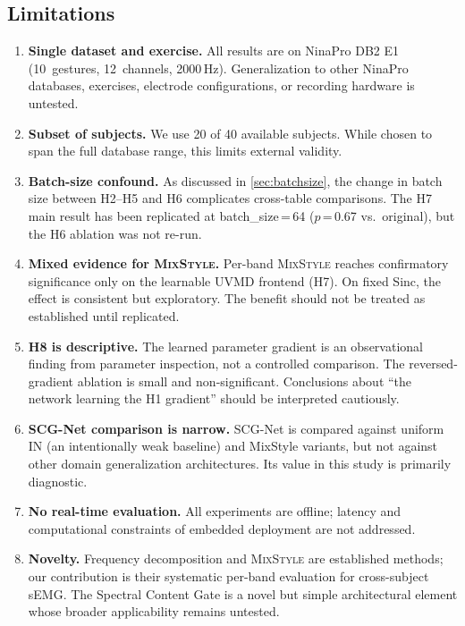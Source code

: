 \documentclass[conference]{IEEEtran}
\newcommand{\mixstyle}{\textsc{MixStyle}}
\newcommand{\uvmd}{\textsc{UVMD}}
\begin{document}
\subsection{Limitations}
\begin{enumerate}
    \item \textbf{Single dataset and exercise.} All results are on NinaPro DB2 E1 (10~gestures, 12~channels, 2000\,Hz). Generalization to other NinaPro databases, exercises, electrode configurations, or recording hardware is untested.
    \item \textbf{Subset of subjects.} We use 20 of 40 available subjects. While chosen to span the full database range, this limits external validity.
    \item \textbf{Batch-size confound.} As discussed in \cref{sec:batchsize}, the change in batch size between H2--H5 and H6 complicates cross-table comparisons. The H7 main result has been replicated at batch\_size\,=\,64 ($p$\,=\,0.67 vs.\ original), but the H6 ablation was not re-run.
    \item \textbf{Mixed evidence for \mixstyle{}.} Per-band \mixstyle{} reaches confirmatory significance only on the learnable \uvmd{} frontend (H7). On fixed Sinc, the effect is consistent but exploratory. The benefit should not be treated as established until replicated.
    \item \textbf{H8 is descriptive.} The learned parameter gradient is an observational finding from parameter inspection, not a controlled comparison. The reversed-gradient ablation is small and non-significant. Conclusions about ``the network learning the H1 gradient'' should be interpreted cautiously.
    \item \textbf{SCG-Net comparison is narrow.} SCG-Net is compared against uniform IN (an intentionally weak baseline) and MixStyle variants, but not against other domain generalization architectures. Its value in this study is primarily diagnostic.
    \item \textbf{No real-time evaluation.} All experiments are offline; latency and computational constraints of embedded deployment are not addressed.
    \item \textbf{Novelty.} Frequency decomposition and \mixstyle{} are established methods; our contribution is their systematic per-band evaluation for cross-subject sEMG. The Spectral Content Gate is a novel but simple architectural element whose broader applicability remains untested.
\end{enumerate}
\end{document}
